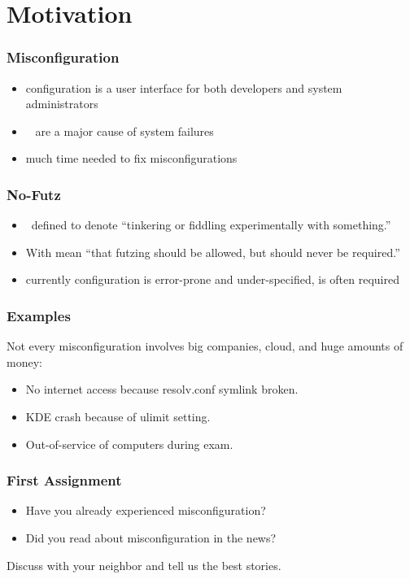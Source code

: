 \section{Motivation}
{
%
\begin{frame}
	\frametitle{Misconfiguration}
	\begin{itemize}
		\item configuration is a user interface for both developers and system administrators
		\item {}~\cite{yin2011empirical,su2007autobash,attariyan2010automating,xu2015systems}
			are a major cause of system failures~\cite{wool2004quantitative,oppenheimer2003internet,pertet2005causes}
		\item much time needed to fix misconfigurations~\cite{rabkin2011static,oppenheimer2003internet,yin2011empirical,mahajan2002bgp}
	\end{itemize}
\end{frame}
\begin{frame}
	\frametitle{No-Futz}
	\begin{itemize}
		\item \citet{holland2001nofutz}~defined  to denote \enquote{tinkering or fiddling experimentally with something.}
		\item With  \citet{holland2001nofutz} mean \enquote{that futzing should be allowed, but should never be required.}
		\item currently configuration is error-prone and under-specified,  is often required
	\end{itemize}
\end{frame}
\begin{frame}
	\frametitle{Examples}
	Not every misconfiguration involves big companies, cloud, and huge amounts of money:
	\begin{itemize}
		\item No internet access because resolv.conf symlink broken.
		\item KDE crash because of ulimit setting.
		\item Out-of-service of computers during exam.
	\end{itemize}
\end{frame}
}
\begin{assignment}
	\frametitle{First Assignment}
	\begin{itemize}
		\item Have you already experienced misconfiguration?
		\item Did you read about misconfiguration in the news?
	\end{itemize}
	\begin{task}
	Discuss with your neighbor and tell us the best stories.
	\end{task}
\end{assignment}

